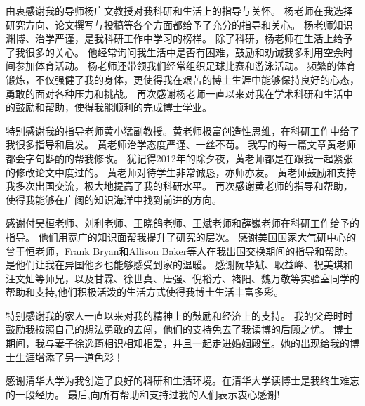 \begin{acknowledgement}
  由衷感谢我的导师杨广文教授对我科研和生活上的指导与关怀。
  杨老师在我选择研究方向、论文撰写与投稿等各个方面都给予了充分的指导和关心。
  杨老师知识渊博、治学严谨，是我科研工作中学习的榜样。
  除了科研，杨老师在生活上给予了我很多的关心。
  他经常询问我生活中是否有困难，鼓励和劝诫我多利用空余时间参加体育活动。
  杨老师还带领我们经常组织足球比赛和游泳活动。
  频繁的体育锻炼，不仅强健了我的身体，更使得我在艰苦的博士生涯中能够保持良好的心态，勇敢的面对各种压力和挑战。 
  再次感谢杨老师一直以来对我在学术科研和生活中的鼓励和帮助，使得我能顺利的完成博士学业。

  特别感谢我的指导老师黄小猛副教授。黄老师极富创造性思维，在科研工作中给了我很多指导和启发。 
  黄老师治学态度严谨、一丝不苟。
  我写的每一篇文章黄老师都会字句斟酌的帮我修改。
  犹记得2012年的除夕夜，黄老师都是在跟我一起紧张的修改论文中度过的。
  黄老师对待学生非常诚恳，亦师亦友。 
  黄老师鼓励和支持我多次出国交流，极大地提高了我的科研水平。
  再次感谢黄老师的指导和帮助，使得我能够在广阔的知识海洋中找到前进的方向。


  感谢付昊桓老师、刘利老师、王晓鸽老师、王斌老师和薛巍老师在科研工作给予的指导。 
  他们用宽广的知识面帮我提升了研究的层次。
  感谢美国国家大气研中心的曾于恒老师，Frank Bryan和Allison Baker等人在我出国交换期间的指导和帮助。
  是他们让我在异国他乡也能够感受到家的温暖。
  感谢阮华斌、耿益峰、祝美琪和汪文灿等师兄，以及甘霖、徐世真、唐强、倪裕芳、褚阳、魏万敬等实验室同学的帮助和支持,他们积极活泼的生活方式使得我博士生活丰富多彩。 

  
  特别感谢我的家人一直以来对我的精神上的鼓励和经济上的支持。
  我的父母时时鼓励我按照自己的想法勇敢的去闯，他们的支持免去了我读博的后顾之忧。
  博士期间，我与妻子徐逸筠相识相知相爱，并且一起走进婚姻殿堂。她的出现给我的博士生涯增添了另一道色彩！
  
  感谢清华大学为我创造了良好的科研和生活环境。在清华大学读博士是我终生难忘的一段经历。
  最后,向所有帮助和支持过我的人们表示衷心感谢!

\end{acknowledgement}
